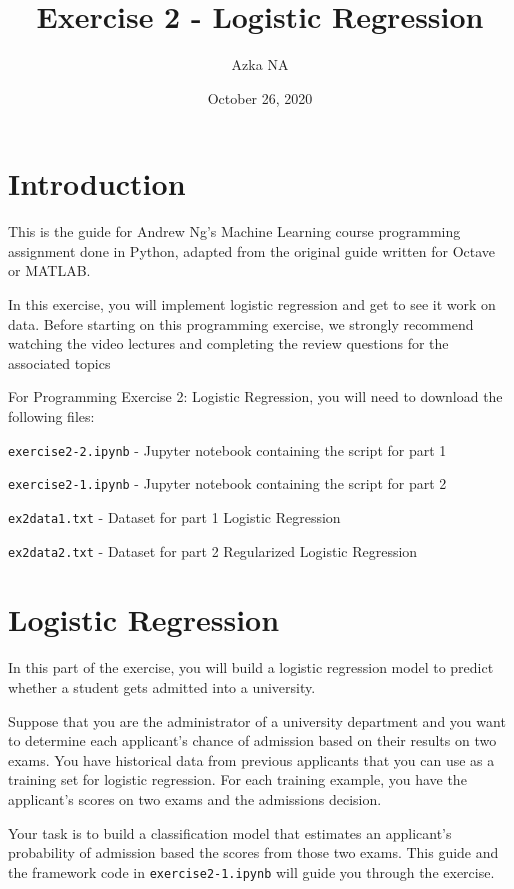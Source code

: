 \documentclass[12pt]{article}
\title{Exercise 2 - Logistic Regression}
\author{Azka NA}
\date{October 26, 2020}
\begin{document}
\maketitle

\section{Introduction}
This is the guide for Andrew Ng's Machine Learning course programming assignment done in Python, adapted from the original guide written for Octave or MATLAB.

In this exercise, you will implement logistic regression and get to see it work on data. Before starting on this programming exercise, we strongly recommend watching the video lectures and completing the review questions for the associated topics

For Programming Exercise 2: Logistic Regression, you will need to download the following files:

\texttt{exercise2-2.ipynb} - Jupyter notebook containing the script for part 1

\texttt{exercise2-1.ipynb} - Jupyter notebook containing the script for part 2

\texttt{ex2data1.txt} - Dataset for part 1 Logistic Regression

\texttt{ex2data2.txt} - Dataset for part 2 Regularized Logistic Regression

\hrulefill

\section{Logistic Regression}

In this part of the exercise, you will build a logistic regression model to predict whether a student gets admitted into a university.

Suppose that you are the administrator of a university department and you want to determine each applicant’s chance of admission based on their results on two exams. You have historical data from previous applicants that you can use as a training set for logistic regression. For each training example, you have the applicant’s scores on two exams and the admissions decision.

Your task is to build a classification model that estimates an applicant’s probability of admission based the scores from those two exams. This guide and the framework code in \texttt{exercise2-1.ipynb} will guide you through the exercise.
\end{document}
